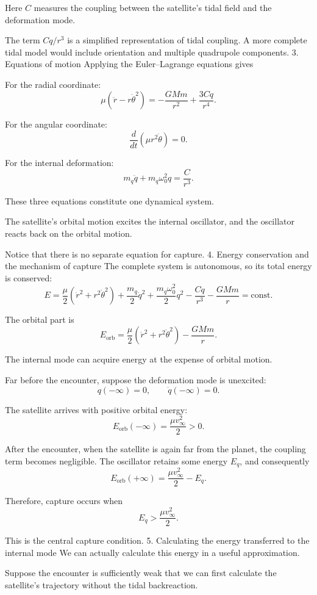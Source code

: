 Here \(C\) measures the coupling between the satellite's tidal field and the deformation mode.

The term \(Cq/r^3\) is a simplified representation of tidal coupling. A more complete tidal model would include orientation and multiple quadrupole components.
3. Equations of motion
Applying the Euler–Lagrange equations gives

For the radial coordinate:
\[
\boxed{
\mu(\ddot r-r\dot\theta^2)
=
-\frac{GMm}{r^2}
+\frac{3Cq}{r^4}.
}
\]

For the angular coordinate:
\[
\boxed{
\frac{d}{dt}(\mu r^2\dot\theta)=0.
}
\]

For the internal deformation:
\[
\boxed{
m_q\ddot q+m_q\omega_0^2q
=\frac{C}{r^3}.
}
\]

These three equations constitute one dynamical system.

The satellite's orbital motion excites the internal oscillator, and the oscillator reacts back on the orbital motion.

Notice that there is no separate equation for capture.
4. Energy conservation and the mechanism of capture
The complete system is autonomous, so its total energy is conserved:
\[
\boxed{
E=
\frac{\mu}{2}(\dot r^2+r^2\dot\theta^2)
+\frac{m_q}{2}\dot q^2
+\frac{m_q\omega_0^2}{2}q^2
-\frac{Cq}{r^3}
-\frac{GMm}{r}
=\mathrm{const}.
}
\]

The orbital part is
\[
E_{\mathrm{orb}}
=
\frac{\mu}{2}(\dot r^2+r^2\dot\theta^2)
-\frac{GMm}{r}.
\]

The internal mode can acquire energy at the expense of orbital motion.

Far before the encounter, suppose the deformation mode is unexcited:
\[
q(-\infty)=0,\qquad \dot q(-\infty)=0.
\]

The satellite arrives with positive orbital energy:
\[
E_{\mathrm{orb}}(-\infty)
=\frac{\mu v_\infty^2}{2}>0.
\]

After the encounter, when the satellite is again far from the planet, the coupling term becomes negligible. The oscillator retains some energy \(E_q\), and consequently
\[
E_{\mathrm{orb}}(+\infty)
=
\frac{\mu v_\infty^2}{2}-E_q.
\]

Therefore, capture occurs when
\[
\boxed{
E_q>\frac{\mu v_\infty^2}{2}.
}
\]

This is the central capture condition.
5. Calculating the energy transferred to the internal mode
We can actually calculate this energy in a useful approximation.

Suppose the encounter is sufficiently weak that we can first calculate the satellite's trajectory without the tidal backreaction.

